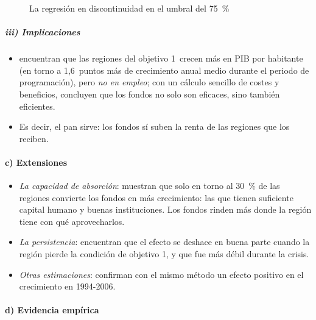 \documentclass[11pt]{article}
\begin{document}
\begin{figure}[H]
\centering
\caption{La regresión en discontinuidad en el umbral del 75~\%}\label{fig:rdd}
\end{figure}

\subparagraph{iii) Implicaciones}

\begin{itemize}
\item \textcite{BeckerEggerVonEhrlich2010} encuentran que las regiones del objetivo 1~crecen más en PIB por habitante (en torno a 1,6~puntos más de crecimiento anual medio durante el periodo de programación), pero \emph{no en empleo}; con un cálculo sencillo de costes y beneficios, concluyen que los fondos no solo son eficaces, sino también eficientes.
\item Es decir, el pan sirve: los fondos sí suben la renta de las regiones que los reciben.
\end{itemize}

\paragraph{c) Extensiones}

\begin{itemize}
\item \emph{La capacidad de absorción}: \textcite{BeckerEggerVonEhrlich2013} muestran que solo en torno al 30~\% de las regiones convierte los fondos en más crecimiento: las que tienen suficiente capital humano y buenas instituciones. Los fondos rinden más donde la región tiene con qué aprovecharlos.
\item \emph{La persistencia}: \textcite{BeckerEggerVonEhrlich2018} encuentran que el efecto se deshace en buena parte cuando la región pierde la condición de objetivo 1, y que fue más débil durante la crisis.
\item \emph{Otras estimaciones}: \textcite{PellegriniEtAl2013} confirman con el mismo método un efecto positivo en el crecimiento en 1994-2006.
\end{itemize}

\paragraph{d) Evidencia empírica}
\end{document}
